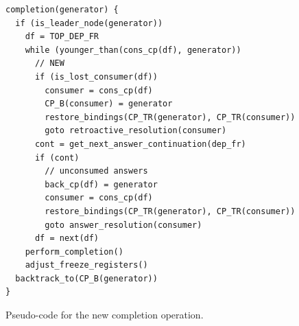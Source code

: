\begin{figure}[ht]
\begin{Verbatim}
completion(generator) {
  if (is_leader_node(generator))
    df = TOP_DEP_FR
    while (younger_than(cons_cp(df), generator))
      // NEW
      if (is_lost_consumer(df))
        consumer = cons_cp(df)
        CP_B(consumer) = generator
        restore_bindings(CP_TR(generator), CP_TR(consumer))
        goto retroactive_resolution(consumer)
      cont = get_next_answer_continuation(dep_fr)
      if (cont)
        // unconsumed answers
        back_cp(df) = generator
        consumer = cons_cp(df)
        restore_bindings(CP_TR(generator), CP_TR(consumer))
        goto answer_resolution(consumer)
      df = next(df)
    perform_completion()
    adjust_freeze_registers()
  backtrack_to(CP_B(generator))
}
\end{Verbatim}
\caption{Pseudo-code for the new completion operation.}
\label{fig:completion_operation_retro}
\end{figure}

